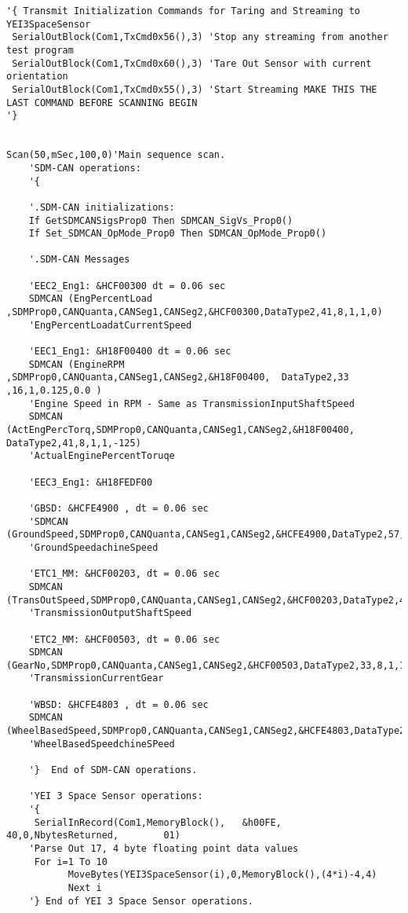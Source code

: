 \begin{lstlisting}[basicstyle=\tiny]
'{ Transmit Initialization Commands for Taring and Streaming to YEI3SpaceSensor
 SerialOutBlock(Com1,TxCmd0x56(),3) 'Stop any streaming from another test program
 SerialOutBlock(Com1,TxCmd0x60(),3) 'Tare Out Sensor with current orientation
 SerialOutBlock(Com1,TxCmd0x55(),3) 'Start Streaming MAKE THIS THE LAST COMMAND BEFORE SCANNING BEGIN
'}
 

Scan(50,mSec,100,0)'Main sequence scan.
    'SDM-CAN operations:
    '{
    
    '.SDM-CAN initializations:
    If GetSDMCANSigsProp0 Then SDMCAN_SigVs_Prop0()
    If Set_SDMCAN_OpMode_Prop0 Then SDMCAN_OpMode_Prop0()  
    
    '.SDM-CAN Messages 
    
    'EEC2_Eng1: &HCF00300 dt = 0.06 sec
    SDMCAN (EngPercentLoad ,SDMProp0,CANQuanta,CANSeg1,CANSeg2,&HCF00300,DataType2,41,8,1,1,0) 
    'EngPercentLoadatCurrentSpeed 
    
    'EEC1_Eng1: &H18F00400 dt = 0.06 sec
    SDMCAN (EngineRPM   ,SDMProp0,CANQuanta,CANSeg1,CANSeg2,&H18F00400,  DataType2,33  ,16,1,0.125,0.0 )
    'Engine Speed in RPM - Same as TransmissionInputShaftSpeed
    SDMCAN (ActEngPercTorq,SDMProp0,CANQuanta,CANSeg1,CANSeg2,&H18F00400,  DataType2,41,8,1,1,-125)
    'ActualEnginePercentToruqe
    
    'EEC3_Eng1: &H18FEDF00
    
    'GBSD: &HCFE4900 , dt = 0.06 sec
    'SDMCAN (GroundSpeed,SDMProp0,CANQuanta,CANSeg1,CANSeg2,&HCFE4900,DataType2,57,16,1,0.001,0)
    'GroundSpeedachineSpeed
    
    'ETC1_MM: &HCF00203, dt = 0.06 sec
    SDMCAN (TransOutSpeed,SDMProp0,CANQuanta,CANSeg1,CANSeg2,&HCF00203,DataType2,49,16,1,0.125,0)
    'TransmissionOutputShaftSpeed
    
    'ETC2_MM: &HCF00503, dt = 0.06 sec
    SDMCAN (GearNo,SDMProp0,CANQuanta,CANSeg1,CANSeg2,&HCF00503,DataType2,33,8,1,1,-125)
    'TransmissionCurrentGear 
    
    'WBSD: &HCFE4803 , dt = 0.06 sec
    SDMCAN (WheelBasedSpeed,SDMProp0,CANQuanta,CANSeg1,CANSeg2,&HCFE4803,DataType2,57,16,1,0.001,0)
    'WheelBasedSpeedchineSPeed      
    
    '}  End of SDM-CAN operations.
         
    'YEI 3 Space Sensor operations:
    '{
     SerialInRecord(Com1,MemoryBlock(),   &h00FE,    40,0,NbytesReturned,        01)			    
    'Parse Out 17, 4 byte floating point data values
     For i=1 To 10
      	   MoveBytes(YEI3SpaceSensor(i),0,MemoryBlock(),(4*i)-4,4)
    	   Next i 
    '} End of YEI 3 Space Sensor operations.
      

\end{lstlisting}
